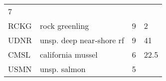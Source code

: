 \documentclass[]{article}
\begin{document}
\begin{longtable}[c]{@{}llll@{}}
\begin{minipage}[t]{0.23\columnwidth}
7
\end{minipage}
\\\addlinespace
\begin{minipage}[t]{0.08\columnwidth}\raggedright
RCKG
\end{minipage} & \begin{minipage}[t]{0.36\columnwidth}\raggedright
rock greenling
\end{minipage} & \begin{minipage}[t]{0.21\columnwidth}\raggedright
9
\end{minipage} & \begin{minipage}[t]{0.23\columnwidth}\raggedright
2
\end{minipage}
\\\addlinespace
\begin{minipage}[t]{0.08\columnwidth}\raggedright
UDNR
\end{minipage} & \begin{minipage}[t]{0.36\columnwidth}\raggedright
unsp. deep near-shore rf
\end{minipage} & \begin{minipage}[t]{0.21\columnwidth}\raggedright
9
\end{minipage} & \begin{minipage}[t]{0.23\columnwidth}\raggedright
41
\end{minipage}
\\\addlinespace
\begin{minipage}[t]{0.08\columnwidth}\raggedright
CMSL
\end{minipage} & \begin{minipage}[t]{0.36\columnwidth}\raggedright
california mussel
\end{minipage} & \begin{minipage}[t]{0.21\columnwidth}\raggedright
6
\end{minipage} & \begin{minipage}[t]{0.23\columnwidth}\raggedright
22.5
\end{minipage}
\\\addlinespace
\begin{minipage}[t]{0.08\columnwidth}\raggedright
USMN
\end{minipage} & \begin{minipage}[t]{0.36\columnwidth}\raggedright
unsp. salmon
\end{minipage} & \begin{minipage}[t]{0.21\columnwidth}\raggedright
5
\end{minipage} & \begin{minipage}[t]{0.23\columnwidth}\raggedright

\end{minipage}
\end{longtable}
\end{document}
